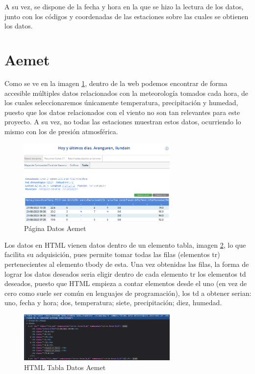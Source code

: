 A su vez, se dispone de la fecha y hora en la que se hizo la lectura de los datos, junto con los códigos y coordenadas de las estaciones sobre las cuales se obtienen los datos.

\section{Aemet}
Como se ve en la imagen \ref{fig:ej3}, dentro de la web podemos encontrar de forma accesible múltiples datos relacionados con la meteorología tomados cada hora, de los cuales seleccionaremos únicamente temperatura, precipitación y humedad, puesto que los datos relacionados con el viento no son tan relevantes para este proyecto. A su vez, no todas las estaciones muestran estos datos, ocurriendo lo mismo con los de presión atmosférica.

\begin{figure} [H]
	\centering
	\includegraphics[width=0.7\textwidth]{fig/AemetData.png}
	\caption[Página Aemet de la estación en Aranguren (Navarra)]{Página Datos Aemet}
	\label{fig:ej3}
\end{figure}

Los datos en HTML vienen datos dentro de un elemento tabla, imagen \ref{fig:ej20}, lo que facilita su adquisición, pues permite tomar todas las filas (elementos tr) pertenecientes al elemento tbody de esta. Una vez obtenidas las filas, la forma de lograr los datos deseados seria eligir dentro de cada elemento tr los elementos td deseados, puesto que HTML empieza a contar elementos desde el uno (en vez de cero como suele ser común en lenguajes de programación), los td a obtener serian: uno, fecha y hora; dos, temperatura; siete, precipitación; diez, humedad.

\begin{figure} [H]
	\centering
	\includegraphics[width=0.7\textwidth]{fig/AemetDataHTML.png}
	\caption[HTML de la tabla de datos de Aemet de la estación en Aranguren (Navarra)]{HTML Tabla Datos Aemet}
	\label{fig:ej20}
\end{figure}


